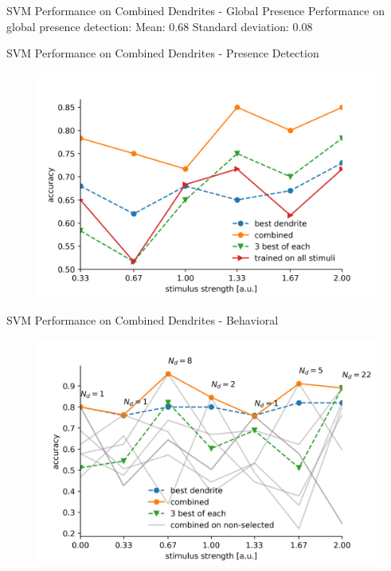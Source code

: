 \documentclass[10pt]{beamer}
\begin{document}
\begin{frame}[fragile]{SVM Performance on Combined Dendrites - Global Presence}
Performance on global presence detection: \newline
Mean: 0.68 \newline
Standard deviation: 0.08
\end{frame}

\begin{frame}[fragile]{SVM Performance on Combined Dendrites - Presence Detection}
\begin{center}
	\begin{figure}
      \includegraphics[width=1.0\textwidth]{combined_presence_alt.png}
	\end{figure}
	\end{center}
\end{frame}

\begin{frame}[fragile]{SVM Performance on Combined Dendrites - Behavioral}
\begin{center}
	\begin{figure}
      \includegraphics[width=1.0\textwidth]{combined_hitmiss.png}
	\end{figure}
	\end{center}
\end{frame}
\end{document}
